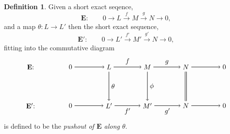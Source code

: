 \documentclass[11.5pt, twoside, a4paper, titlepage]{report}
\theoremstyle{definition}
\newtheorem{mydef}{Definition}[section]
\theoremstyle{plain}
\begin{document}
\begin{mydef} \label{pushoutdef}
Given a short exact seqence,
\begin{equation*}
\mathbf{E}: \qquad 0\xrightarrow{}L\xrightarrow{f} M \xrightarrow{g} N \xrightarrow{} 0,
\end{equation*}
and a map $\theta : L \to L'$ then the short exact sequence, 
\begin{equation*}
\mathbf{E'}: \qquad 0\xrightarrow{} L' \xrightarrow{f'} M' \xrightarrow{g'} N \xrightarrow{}0,
\end{equation*}
fitting into the commutative diagram
\begin{equation*}
\begin{tikzpicture}[->,-latex, auto, main path/.style={->, semithick}, main node/.style={}]
\node	[main node]		(1) at (0,0)		{$\mathbf{E}$: \quad };
\node	[main node]		(2) at (2,0)		{$0$};
\node	[main node]		(3) at (4,0)		{$L$};
\node [main node]		(4) at (6,0)		{$M$};
\node [main node]		(5) at (8,0)		{$N$};
\node	[main node]		(11) at (10,0)	{$0$};

\node	[main node]		(6) at (0,-2)		{$\mathbf{E'}$: \quad};
\node	[main node]		(7) at (2,-2)		{$0$};
\node	[main node]		(8) at (4,-2)		{$L'$};
\node [main node]		(9) at (6,-2)		{$M'$};
\node [main node]		(10) at (8,-2)	{$N$};
\node [main node]		(13) at (10,-2)	{$0$};

\draw (2) edge [main path] node [auto] {$$} (3);
\draw (3) edge [main path] node [auto] {$f$} (4);
\draw (4) edge [main path] node [auto] {$g$} (5);
\draw (5) edge [main path] (11);

\draw (7) edge [main path] node [auto] {$$} (8);
\draw (8) edge [main path] node [auto, swap] {$f'$} (9);
\draw (9) edge [main path] node [auto, swap] {$g'$} (10);
\draw (10) edge [main path] (13);

\draw (3) edge [main path] node [auto] {$\theta$} (8);
\draw (4) edge [main path] node [auto] {$\phi$} (9);
\draw (5) edge [-, semithick, double, double distance=1.5pt](10);
\end{tikzpicture}
\end{equation*}
is defined to be the \emph{pushout of $\mathbf{E}$ along $\theta$}.
\end{mydef}
\end{document}
